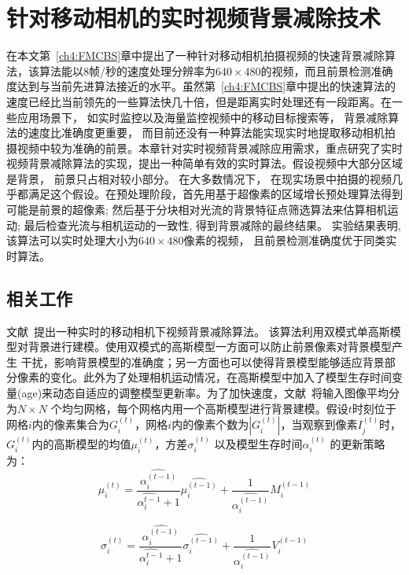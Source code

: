 \chapter{针对移动相机的实时视频背景减除技术}
\label{ch5:RMCBS}

在本文第~\ref{ch4:FMCBS}章中提出了一种针对移动相机拍摄视频的快速背景减除算法，该算法能以8帧/秒的速度处理分辨率为$640 \times 480$的视频，而且前景检测准确度达到与当前先进算法接近的水平。虽然第~\ref{ch4:FMCBS}章中提出的快速算法的速度已经比当前领先的一些算法\cite{gbsuperpixel}快几十倍，但是距离实时处理还有一段距离。在一些应用场景下， 如实时监控以及海量监控视频中的移动目标搜索等， 背景减除算法的速度比准确度更重要， 而目前还没有一种算法能实现实时地提取移动相机拍摄视频中较为准确的前景。本章针对实时视频背景减除应用需求，重点研究了实时视频背景减除算法的实现，提出一种简单有效的实时算法。假设视频中大部分区域是背景， 前景只占相对较小部分。 在大多数情况下， 在现实场景中拍摄的视频几乎都满足这个假设。在预处理阶段，首先用基于超像素的区域增长预处理算法得到可能是前景的超像素; 然后基于分块相对光流的背景特征点筛选算法来估算相机运动; 最后检查光流与相机运动的一致性, 得到背景减除的最终结果。 实验结果表明, 该算法可以实时处理大小为$640 \times 480$像素的视频， 且前景检测准确度优于同类实时算法。



\section{相关工作}
\label{ch5:sec:relatedWorks}
 文献~提出一种实时的移动相机下视频背景减除算法。 该算法利用双模式单高斯模型对背景进行建模。使用双模式的高斯模型一方面可以防止前景像素对背景模型产生 干扰，影响背景模型的准确度；另一方面也可以使得背景模型能够适应背景部分像素的变化。此外为了处理相机运动情况，在高斯模型中加入了模型生存时间变量(age)来动态自适应的调整模型更新率。为了加快速度，文献~将输入图像平均分为$ N \times N $ 个均匀网格，每个网格内用一个高斯模型进行背景建模。假设$t$时刻位于网格$i$内的像素集合为$ G_{i}^{(t)}$，网格$i$内的像素个数为$ |G_{i}^{(t)}|$，当观察到像素$ I_j^{(t)}$时，$G_i^{(t)}$内的高斯模型的均值$ \mu_i^{(t)}$，方差$ \sigma_i^{(t)}$ 以及模型生存时间$\alpha_i^{(t)}$ 的更新策略为：
 $$\mu_i^{(t)} = \frac{\hat{\alpha_i^{(t-1)}}}{\hat{\alpha_i^{t-1}}+1}\hat{\mu_i^{(t-1)}} + \frac{1}{\hat{\alpha_i^{(t-1)}}}M_i^{(t-1)}$$

$$\sigma_i^{(t)} = \frac{\hat{\alpha_i^{(t-1)}}}{\hat{\alpha_i^{t-1}}+1}\hat{\sigma_i^{(t-1)}} + \frac{1}{\hat{\alpha_i^{(t-1)}}}V_i^{(t-1)}$$

